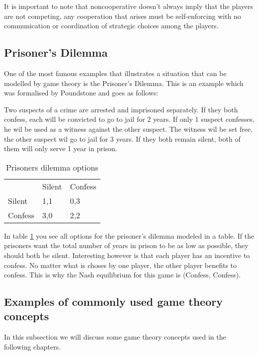 It is important to note that noncooperative doesn't always imply that the players are not competing, any cooperation that arises must be self-enforcing with no communication or coordination of strategic choices among the players.\cite{keypaper}

\subsection{Prisoner's Dilemma}
One of the most famous examples that illustrates a situation that can be modelled by game theory is the Prisoner's Dilemma. This is an example which was formalised by Poundstone \cite{poundstone} and goes as follows: 

Two suspects of a crime are arrested and imprisoned separately. If they both confess, each will be convicted to go to jail for 2 years. If only 1 suspect confesses, he wil be used as a witness against the other suspect. The witness wil be set free, the other suspect wil go to jail for 3 years. If they both remain silent, both of them will only serve 1 year in prison.

\begin{table}[h]
\centering
\begin{tabular}{lll}
 & Silent & Confess \\ \cline{2-3} 
\multicolumn{1}{l|}{Silent} & \multicolumn{1}{l|}{1,1} & \multicolumn{1}{l|}{0,3} \\ \cline{2-3} 
\multicolumn{1}{l|}{Confess} & \multicolumn{1}{l|}{3,0} & \multicolumn{1}{l|}{2,2} \\ \cline{2-3} 
\end{tabular}
\caption{Prisoners dilemma options}
\label{prisoners-d}
\end{table}

In table \ref{prisoners-d} you see all options for the prisoner's dilemma modeled in a table. If the prisoners want the total number of years in prison to be as low as possible, they should both be silent. Interesting however is that each player has an incentive to confess. No matter what is choses by one player, the other player benefits to confess. This is why the Nash equilibrium for this game is (Confess, Confess).    

\subsection{Examples of commonly used game theory concepts}
In this subsection we will discuss some game theory concepts used in the following chapters. 

